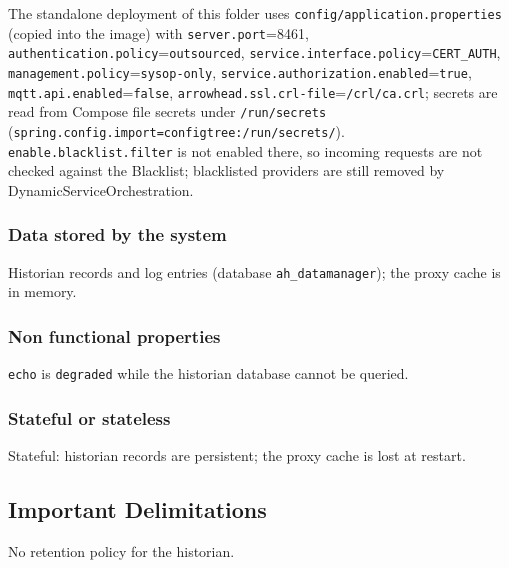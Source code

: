 \documentclass[a4paper]{arrowhead}
\begin{document}
The standalone deployment of this folder uses \texttt{config/\allowbreak{}application.\allowbreak{}properties} (copied into the image) with \texttt{server.\allowbreak{}port}=8461, \texttt{authentication.\allowbreak{}policy}=\texttt{outsourced}, \texttt{service.\allowbreak{}interface.\allowbreak{}policy}=\texttt{CERT\_AUTH}, \texttt{management.\allowbreak{}policy}=\texttt{sysop-\allowbreak{}only}, \texttt{service.\allowbreak{}authorization.\allowbreak{}enabled}=\texttt{true}, \texttt{mqtt.\allowbreak{}api.\allowbreak{}enabled}=\texttt{false}, \texttt{arrowhead.\allowbreak{}ssl.\allowbreak{}crl-\allowbreak{}file}=\texttt{/\allowbreak{}crl/\allowbreak{}ca.\allowbreak{}crl}; secrets are read from Compose file secrets under \texttt{/\allowbreak{}run/\allowbreak{}secrets} (\texttt{spring.\allowbreak{}config.\allowbreak{}import=\allowbreak{}configtree:\allowbreak{}/\allowbreak{}run/\allowbreak{}secrets/}). \texttt{enable.\allowbreak{}blacklist.\allowbreak{}filter} is not enabled there, so incoming requests are not checked against the Blacklist; blacklisted providers are still removed by Dynamic\allowbreak{}Service\allowbreak{}Orchestration.

\subsubsection{Data stored by the system}

Historian records and log entries (database \texttt{ah\_\allowbreak{}datamanager}); the proxy cache is in memory.

\subsubsection{Non functional properties}

\texttt{echo} is \texttt{degraded} while the historian database cannot be queried.

\subsubsection{Stateful or stateless}

Stateful: historian records are persistent; the proxy cache is lost at restart.

\subsection{Important Delimitations}
\label{sec:delimitations}

No retention policy for the historian.
\end{document}
